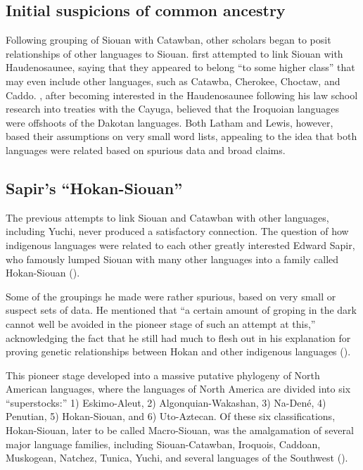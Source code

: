\documentclass[output=paper]{LSP/langsci}
\begin{document}
\subsection{Initial suspicions of common ancestry}

Following  grouping of Siouan with Catawban, other scholars began to posit relationships of other languages to Siouan. \citet{Latham1856} first attempted to link Siouan with Haudenosaunee, saying that they appeared to belong ``to some higher class'' that may even include other languages, such as Catawba, Cherokee, Choctaw, and Caddo. \citet{Lewis1871}, 
after becoming interested in the Haudenosaunee following his law school research into treaties with the Cayuga, believed that the Iroquoian languages were offshoots of the Dakotan languages. Both Latham and Lewis, however, based their assumptions on very small word lists, appealing to the idea that both languages were related based on spurious data and broad claims.

\subsection{Sapir's ``Hokan-Siouan''}

The previous attempts to link Siouan and Catawban with other languages, including Yuchi, never produced a satisfactory connection. The question of how indigenous languages were related to each other greatly interested Edward Sapir, who famously lumped Siouan with many other languages into a family called Hokan-Siouan (\citealt{Sapir1929}). 

Some of the groupings he made were rather spurious, based on very small or suspect sets of data. He mentioned that ``a certain amount of groping in the dark cannot well be avoided in the pioneer stage of such an attempt at this,'' acknowledging the fact that he still had much to flesh out in his explanation for proving genetic relationships between Hokan and other indigenous languages (\citealt[289]{Sapir1920}). 

This pioneer stage developed into a massive putative phylogeny of North American languages, where the languages of North America are divided into six ``superstocks:'' 1) Eskimo-Aleut, 2) Algonquian-Wakashan, 3) Na-Den\'e, 4) Penutian, 5) Hokan-Siouan, and 6) Uto-Aztecan. Of these six classifications, Hokan-Siouan, later to be called Macro-Siouan, was the amalgamation of several major language families, including Siouan-Catawban, Iroquois, Caddoan, Muskogean, Natchez, Tunica, Yuchi, and several languages of the Southwest (\citealt{Sapir1929}). 
\end{document}
